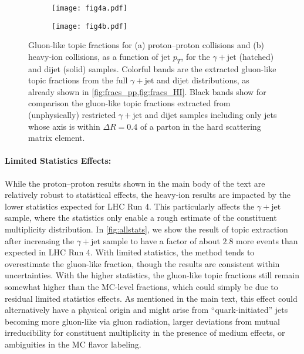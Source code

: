 \documentclass[aps,prl,twocolumn,preprintnumbers,showpacs,floatfix,nofootinbib]{revtex4-1}
\begin{document}
\begin{figure*}
\begin{subfigure}[b]{0.4\linewidth}
	\centering
	\texttt{[image: fig4a.pdf]}
	\caption{}
	\label{fig:fracs_pp_dR}
\end{subfigure}\hspace{0.05\textwidth}
\begin{subfigure}[b]{0.4\linewidth}
	\centering
	\texttt{[image: fig4b.pdf]}
	\caption{}
	\label{fig:fracs_HI_dR}
\end{subfigure}
\caption{Gluon-like topic fractions for (a) proton--proton collisions and (b) heavy-ion collisions, as a function of jet $p_T$, for the $\gamma+\text{jet}$ (hatched) and dijet (solid) samples.
%
Colorful bands are the extracted gluon-like topic fractions from the full $\gamma+\text{jet}$ and dijet distributions, as already shown in \cref{fig:fracs_pp,fig:fracs_HI}.
%
Black bands show for comparison the gluon-like topic fractions extracted from (unphysically) restricted $\gamma+\text{jet}$ and dijet samples including only jets whose axis is within $\Delta R = 0.4$ of a parton in the hard scattering matrix element.
}
\label{fig:fractions_dR}
\end{figure*}


\paragraph{Limited Statistics Effects:}
%
While the proton--proton results shown in the main body of the text are relatively robust to statistical effects, the heavy-ion results are impacted by the lower statistics expected for LHC Run 4.
%
This particularly affects the $\gamma+\text{jet}$ sample, where the statistics only enable a rough estimate of the constituent multiplicity distribution.
%
In \cref{fig:allstats}, we show the result of topic extraction after increasing the $\gamma+\text{jet}$ sample to have a factor of about $2.8$ more events than expected in LHC Run 4.
%
With limited statistics, the method tends to overestimate the gluon-like fraction, though the results are consistent within uncertainties.
%
With the higher statistics, the gluon-like topic fractions still remain somewhat higher than the MC-level fractions, which could simply be due to residual limited statistics effects.
%
As mentioned in the main text, this effect could alternatively have a physical origin and might arise from ``quark-initiated'' jets becoming more gluon-like via gluon radiation, larger deviations from mutual irreducibility for constituent multiplicity in the presence of medium effects, or ambiguities in the MC flavor labeling.
\end{document}
